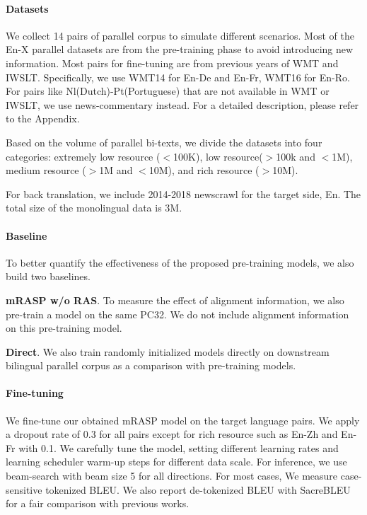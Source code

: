 \documentclass[11pt,a4paper]{article}
\newcommand{\method}{mRASP\xspace}
\newcommand{\baseline}{Direct}
\newcommand{\dataset}{PC32\xspace}
\begin{document}
 \paragraph{Datasets}
We collect 14 pairs of parallel corpus to simulate different scenarios. Most of the En-X parallel datasets are from the pre-training phase to avoid introducing new information. Most pairs for fine-tuning are from previous years of WMT and IWSLT. Specifically, we use WMT14 for En-De and En-Fr, WMT16 for En-Ro. For pairs like Nl(Dutch)-Pt(Portuguese) that are not available in WMT or IWSLT, we use news-commentary instead. 
For a detailed description, please refer to the Appendix.


Based on the volume of parallel bi-texts, we divide the datasets into four categories: extremely low resource ($<$100K), low resource($>$100k and $<$1M), medium resource ($>$1M and $<$10M), and rich resource ($>$10M).

For back translation, we include 2014-2018 newscrawl for the target side, En. The total size of the monolingual data is 3M.

\paragraph{Baseline}

To better quantify the effectiveness of the proposed pre-training models, we also build two baselines.


\textbf{\method w/o RAS}. To measure the effect of alignment information, we also pre-train a model on the same \dataset. We do not include alignment information on this pre-training model.

\textbf{\baseline}.
We also train randomly initialized models directly on downstream bilingual parallel corpus as a comparison with pre-training models.





\paragraph{Fine-tuning}
We fine-tune our obtained \method model on the target language pairs. 
We apply a dropout rate of 0.3 for all pairs except for rich resource such as En-Zh and En-Fr with 0.1. We carefully tune the model, setting different learning rates and learning scheduler warm-up steps for different data scale. For inference, we use beam-search with beam size 5 for all directions.
For most cases, We measure case-sensitive tokenized BLEU. We also report de-tokenized BLEU with SacreBLEU \cite{DBLP:conf/wmt/Post18} for a fair comparison with previous works.
\end{document}
